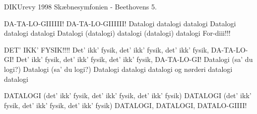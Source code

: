 {DIKUrevy 1998}
{Skæbnesymfonien - Beethovens 5.}
{
DA-TA-LO-GIIIIII!
DA-TA-LO-GIIIIII!
Datalogi datalogi datalogi
Datalogi datalogi datalogi
Datalogi (datalogi) datalogi (datalogi) datalogi For-diii!!!

DET' IKK' FYSIK!!!!
Det' ikk' fysik, det' ikk' fysik, det' ikk' fysik, DA-TA-LO-GI!
Det' ikk' fysik, det' ikk' fysik, det' ikk' fysik, DA-TA-LO-GI!
Datalogi (sa' du logi?) Datalogi (sa' du logi?)
Datalogi datalogi datalogi og nørderi datalogi datalogi

DATALOGI (det' ikk' fysik, det' ikk' fysik, det' ikk' fysik)
DATALOGI (det' ikk' fysik, det' ikk' fysik, det' ikk' fysik)
DATALOGI, DATALOGI, DATALO-GIIII!
}